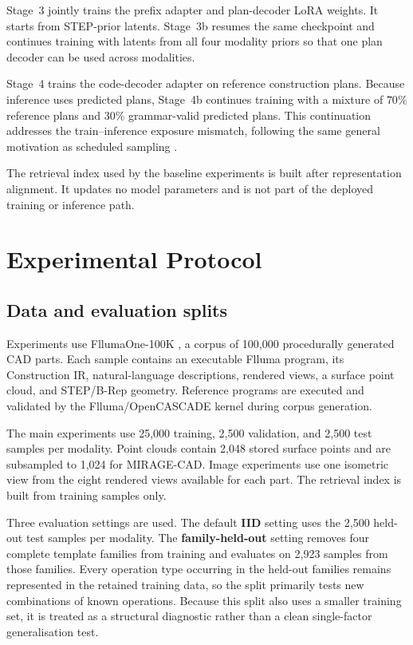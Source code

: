 \documentclass[preprint,12pt]{elsarticle}
\begin{document}
Stage~3 jointly trains the prefix adapter and plan-decoder LoRA weights. It
starts from STEP-prior latents. Stage~3b resumes the same checkpoint and
continues training with latents from all four modality priors so that one plan
decoder can be used across modalities.

Stage~4 trains the code-decoder adapter on reference construction plans.
Because inference uses predicted plans, Stage~4b continues training with a
mixture of $70\%$ reference plans and $30\%$ grammar-valid predicted plans.
This continuation addresses the train--inference exposure mismatch, following
the same general motivation as scheduled sampling
\cite{bengio2015scheduledsampling}.

The retrieval index used by the baseline experiments is built after
representation alignment. It updates no model parameters and is not part of
the deployed training or inference path.


\section{Experimental Protocol}
\label{sec:setup}

\subsection{Data and evaluation splits}
\label{sec:data}

Experiments use FllumaOne-100K
\cite{zhan2026fllumaonecodenativemultimodalcad}, a corpus of 100,000
procedurally generated CAD parts. Each sample contains an executable Flluma
program, its Construction IR, natural-language descriptions, rendered views,
a surface point cloud, and STEP/B-Rep geometry. Reference programs are
executed and validated by the Flluma/OpenCASCADE kernel during corpus
generation.

The main experiments use 25,000 training, 2,500 validation, and 2,500 test
samples per modality. Point clouds contain 2,048 stored surface points and are
subsampled to 1,024 for MIRAGE-CAD. Image experiments use one isometric view
from the eight rendered views available for each part. The retrieval index is
built from training samples only.

Three evaluation settings are used. The default \textbf{IID} setting uses the
2,500 held-out test samples per modality. The \textbf{family-held-out} setting
removes four complete template families from training and evaluates on 2,923
samples from those families. Every operation type occurring in the held-out
families remains represented in the retained training data, so the split
primarily tests new combinations of known operations. Because this split also
uses a smaller training set, it is treated as a structural diagnostic rather
than a clean single-factor generalisation test.
\end{document}
